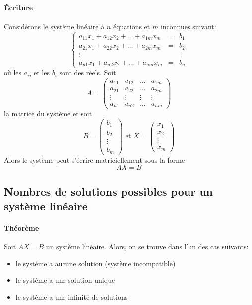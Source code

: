 \paragraph{Écriture} Considérons le système linéaire à $n$ équations et $m$ inconnues suivant:
$$\left\{ \begin{array}{rcl}
  a_{1 1} x_{1} + a_{1 2} x_2 + \ldots + a_{1 m} x_m & = & b_1 \\
  a_{2 1} x_{1} + a_{2 2} x_2 + \ldots + a_{2 m} x_m & = & b_2 \\
  \vdots & & \vdots \\
  a_{n 1} x_{1} + a_{n 2} x_2 + \ldots + a_{n m} x_m & = & b_n
\end{array}$$
où les $a_{i j}$ et les $b_{i}$ sont des réels. Soit
$$A = \begin{pmatrix}
  a_{1 1} & a_{1 2} & \dots & a_{1 m} \\
  a_{2 1} & a_{2 2} & \dots & a_{2 m} \\
  \vdots & \vdots & \vdots & \vdots \\
  a_{n 1} & a_{n 2} & \dots & a_{n m}
\end{pmatrix}$$
la matrice du système et soit
$$B = \begin{pmatrix} b_1 \\ b_2 \\ \vdots \\ b_m \end{pmatrix} \text{ et } 
  X = \begin{pmatrix} x_1 \\ x_2 \\ \vdots \\ x_m \end{pmatrix}$$
Alors le système peut s'écrire matriciellement sous la forme
$$A X = B$$

%
\subsection{Nombres de solutions possibles pour un système linéaire}
%
\paragraph{Théorème} Soit $A X = B$ un système linéaire. Alors, on se trouve dans l'un des cas suivants:
\begin{itemize}
  \item le système a aucune solution (système incompatible) 
  \item le système a une solution unique
  \item le système a une infinité de solutions
\end{itemize}

